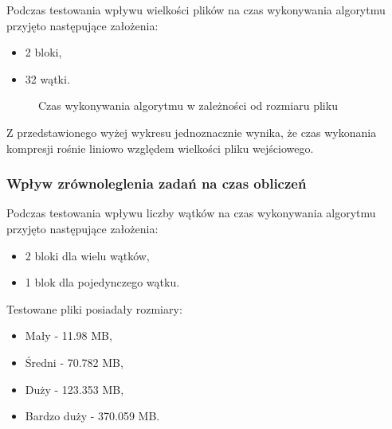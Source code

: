 \documentclass[12pt,a4paper,titlepage]{article}
\begin{document}
\newpage
Podczas testowania wpływu wielkości plików na czas wykonywania algorytmu przyjęto następujące założenia:
\begin{itemize}
    \item 2 bloki,
    \item 32 wątki.
\end{itemize}

\begin{figure}[H]
\centering
\caption{Czas wykonywania algorytmu w zależności od rozmiaru pliku}
\end{figure}

Z przedstawionego wyżej wykresu jednoznacznie wynika, że czas wykonania kompresji rośnie liniowo względem wielkości pliku wejściowego.
\newpage
\subsubsection{Wpływ zrównoleglenia zadań na czas obliczeń}
Podczas testowania wpływu liczby wątków na czas wykonywania algorytmu przyjęto następujące założenia:
\begin{itemize}
    \item 2 bloki dla wielu wątków,
    \item 1 blok dla pojedynczego wątku.
\end{itemize}
Testowane pliki posiadały rozmiary:
\begin{itemize}
    \item Mały - 11.98 MB,
    \item Średni - 70.782 MB,
    \item Duży - 123.353 MB,
    \item Bardzo duży - 370.059 MB.
\end{itemize}
\end{document}
